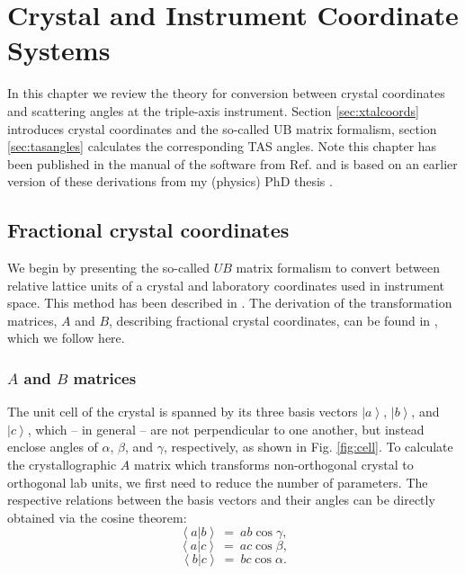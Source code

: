 %
%

\chapter{Crystal and Instrument Coordinate Systems}
\label{ch:xtal}

In this chapter we review the theory for conversion between crystal coordinates and scattering angles at the triple-axis instrument. Section \ref{sec:xtalcoords} introduces crystal coordinates and the so-called UB matrix formalism, section \ref{sec:tasangles} calculates the corresponding TAS angles. Note this chapter has been published in the manual of the software from Ref. \cite{Takin2021} and is based on an earlier version of these derivations from my (physics) PhD thesis \cite[pp. 139-143]{PhDWeber}.


\section{Fractional crystal coordinates \label{sec:xtalcoords}}

We begin by presenting the so-called $UB$ matrix formalism to convert between relative lattice units of a crystal and laboratory coordinates used in instrument space. This method has been described in \cite{Lumsden2005}. The derivation of the transformation matrices, $A$ and $B$, describing fractional crystal coordinates, can be found in \cite{wiki_fractional}, which we follow here.

\subsection{$A$ and $B$ matrices}
The unit cell of the crystal is spanned by its three basis vectors $\left| a \right>$, $\left| b \right>$, and $\left| c \right>$, which -- in general -- are not perpendicular to one another, but instead enclose angles of $\alpha$, $\beta$, and $\gamma$, respectively, as shown in Fig. \ref{fig:cell}. 
To calculate the crystallographic $A$ matrix which transforms non-orthogonal crystal to orthogonal lab units, we first need to reduce the number of parameters.
The respective relations between the basis vectors and their angles can be directly obtained via the cosine theorem:
\begin{equation} \left< a | b \right > \ =\  ab \cos \gamma, \label{ab} \end{equation}
\begin{equation} \left< a | c \right > \ =\  ac \cos \beta, \label{ac} \end{equation}
\begin{equation} \left< b | c \right > \ =\  bc \cos \alpha. \label{bc} \end{equation}

